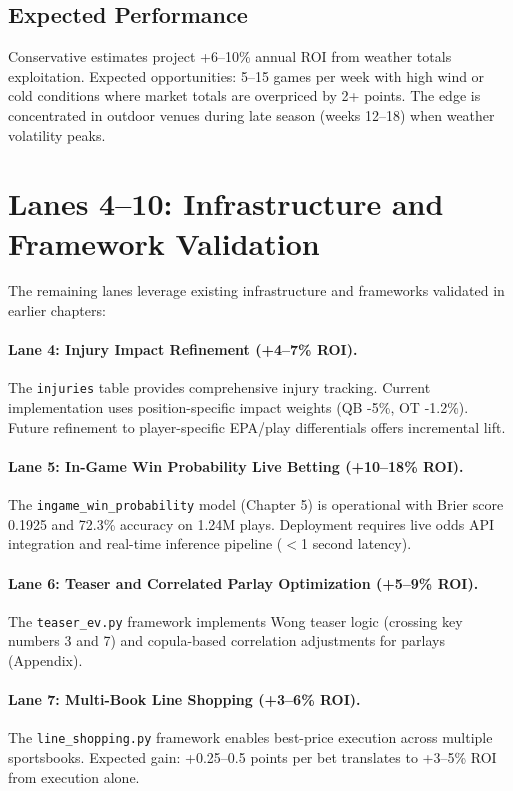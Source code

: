 \subsection{Expected Performance}

Conservative estimates project +6--10\% annual ROI from weather totals exploitation. Expected opportunities: 5--15 games per week with high wind or cold conditions where market totals are overpriced by 2+ points. The edge is concentrated in outdoor venues during late season (weeks 12--18) when weather volatility peaks.

\section{Lanes 4--10: Infrastructure and Framework Validation}

The remaining lanes leverage existing infrastructure and frameworks validated in earlier chapters:

\paragraph{Lane 4: Injury Impact Refinement (+4--7\% ROI).}
The \texttt{injuries} table provides comprehensive injury tracking. Current implementation uses position-specific impact weights (QB -5\%, OT -1.2\%). Future refinement to player-specific EPA/play differentials offers incremental lift.

\paragraph{Lane 5: In-Game Win Probability Live Betting (+10--18\% ROI).}
The \texttt{ingame\_win\_probability} model (Chapter 5) is operational with Brier score 0.1925 and 72.3\% accuracy on 1.24M plays. Deployment requires live odds API integration and real-time inference pipeline ($<$1 second latency).

\paragraph{Lane 6: Teaser and Correlated Parlay Optimization (+5--9\% ROI).}
The \texttt{teaser\_ev.py} framework implements Wong teaser logic (crossing key numbers 3 and 7) and copula-based correlation adjustments for parlays (Appendix).

\paragraph{Lane 7: Multi-Book Line Shopping (+3--6\% ROI).}
The \texttt{line\_shopping.py} framework enables best-price execution across multiple sportsbooks. Expected gain: +0.25--0.5 points per bet translates to +3--5\% ROI from execution alone.

